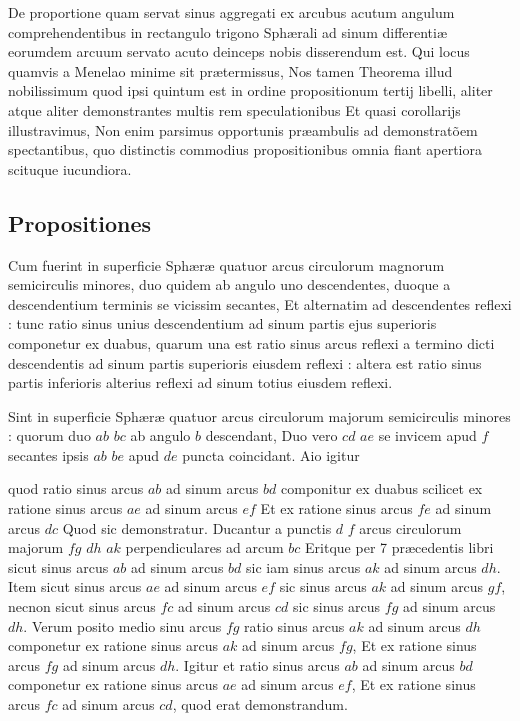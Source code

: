 \documentclass[11pt,a4paper]{article}
\begin{document}
De proportione quam servat sinus aggregati ex arcubus acutum angulum comprehendentibus in rectangulo trigono Sphærali ad sinum differentiæ eorumdem arcuum servato acuto deinceps nobis disserendum est. Qui locus quamvis a Menelao minime sit prætermissus, Nos tamen Theorema illud nobilissimum quod ipsi quintum est in ordine propositionum tertij libelli, aliter atque aliter demonstrantes multis rem speculationibus Et quasi corollarijs illustravimus, Non enim parsimus opportunis præambulis ad demonstratõem spectantibus, quo distinctis commodius propositionibus omnia fiant apertiora scituque iucundiora.

\subsection*{Propositiones}

Cum fuerint in superficie Sphæræ quatuor arcus circulorum magnorum semicirculis minores, duo quidem ab angulo uno descendentes, duoque a descendentium terminis se vicissim secantes, Et alternatim ad descendentes reflexi : tunc ratio sinus unius descendentium ad sinum partis ejus superioris componetur ex duabus, quarum una est ratio sinus arcus reflexi a termino dicti descendentis ad sinum partis superioris eiusdem reflexi : altera est ratio sinus partis inferioris alterius reflexi ad sinum totius eiusdem reflexi.

Sint in superficie Sphæræ quatuor arcus circulorum majorum semicirculis minores : quorum duo $ab$ $bc$ ab angulo $b$ descendant, Duo vero $cd$ $ae$ se invicem apud $f$ secantes ipsis $ab$ $be$ apud $de$ puncta coincidant. Aio igitur

quod ratio sinus arcus $ab$ ad sinum arcus $bd$ componitur ex duabus scilicet ex ratione sinus arcus $ae$ ad sinum arcus $ef$ Et ex ratione sinus arcus $fe$ ad sinum arcus $dc$ Quod sic demonstratur. Ducantur a punctis $d$ $f$ arcus circulorum majorum $fg$ $dh$ $ak$ perpendiculares ad arcum $bc$ Eritque per 7 præcedentis libri sicut sinus arcus $ab$ ad sinum arcus $bd$ sic iam sinus arcus $ak$ ad sinum arcus $dh$. Item sicut sinus arcus $ae$ ad sinum arcus $ef$ sic sinus arcus $ak$ ad sinum arcus $gf$, necnon sicut sinus arcus $fc$ ad sinum arcus $cd$ sic sinus arcus $fg$ ad sinum arcus $dh$. Verum posito medio sinu arcus $fg$ ratio sinus arcus $ak$ ad sinum arcus $dh$ componetur ex ratione sinus arcus $ak$ ad sinum arcus $fg$, Et ex ratione sinus arcus $fg$ ad sinum arcus $dh$. Igitur et ratio sinus arcus $ab$ ad sinum arcus $bd$ componetur ex ratione sinus arcus $ae$ ad sinum arcus $ef$, Et ex ratione sinus arcus $fc$ ad sinum arcus $cd$, quod erat demonstrandum.
\end{document}
